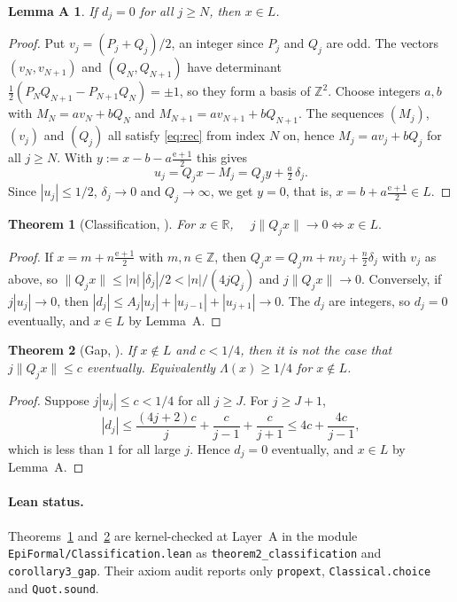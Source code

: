 \documentclass[11pt]{article}
\newtheorem{theorem}{Theorem}
\newtheorem*{lemmaA}{Lemma A}
\theoremstyle{definition}
\theoremstyle{remark}
\newcommand{\R}{\mathbb{R}}
\newcommand{\Z}{\mathbb{Z}}
\newcommand{\ee}{\mathrm{e}}
\newcommand{\Lam}{\Lambda}
\begin{document}
\begin{lemmaA}
If $d_j=0$ for all $j\ge N$, then $x\in L$.
\end{lemmaA}

\begin{proof}
Put $v_j=(P_j+Q_j)/2$, an integer since $P_j$ and $Q_j$ are odd. The
vectors $(v_N,v_{N+1})$ and $(Q_N,Q_{N+1})$ have determinant
$\tfrac12(P_NQ_{N+1}-P_{N+1}Q_N)=\pm1$, so they form a basis of $\Z^2$.
Choose integers $a,b$ with $M_N=av_N+bQ_N$ and $M_{N+1}=av_{N+1}+bQ_{N+1}$.
The sequences $(M_j)$, $(v_j)$ and $(Q_j)$ all satisfy \eqref{eq:rec}
from index $N$ on, hence $M_j=av_j+bQ_j$ for all $j\ge N$. With
$y:=x-b-a\frac{\ee+1}{2}$ this gives
\[
 u_j=Q_jx-M_j=Q_jy+\tfrac a2\,\delta_j .
\]
Since $|u_j|\le1/2$, $\delta_j\to0$ and $Q_j\to\infty$, we get $y=0$, that
is, $x=b+a\frac{\ee+1}{2}\in L$.
\end{proof}

\begin{theorem}[Classification, {\cite[Thm.~2]{Phase1}}]\label{thm:class}
For $x\in\R$, $\quad j\|Q_jx\|\to0\iff x\in L.$
\end{theorem}

\begin{proof}
If $x=m+n\frac{\ee+1}{2}$ with $m,n\in\Z$, then
$Q_jx=Q_jm+nv_j+\tfrac n2\delta_j$ with $v_j$ as above, so
$\|Q_jx\|\le|n|\,|\delta_j|/2<|n|/(4jQ_j)$ and $j\|Q_jx\|\to0$.
Conversely, if $j|u_j|\to0$, then
$|d_j|\le A_j|u_j|+|u_{j-1}|+|u_{j+1}|\to0$. The $d_j$ are integers, so
$d_j=0$ eventually, and $x\in L$ by Lemma~A.
\end{proof}

\begin{theorem}[Gap, {\cite[Cor.~3]{Phase1}}]\label{thm:gap}
If $x\notin L$ and $c<1/4$, then it is \emph{not} the case that
$j\|Q_jx\|\le c$ eventually. Equivalently $\Lam(x)\ge1/4$ for $x\notin L$.
\end{theorem}

\begin{proof}
Suppose $j|u_j|\le c<1/4$ for all $j\ge J$. For $j\ge J+1$,
\[
 |d_j|\le\frac{(4j+2)c}{j}+\frac{c}{j-1}+\frac{c}{j+1}
 \le4c+\frac{4c}{j-1},
\]
which is less than $1$ for all large $j$. Hence $d_j=0$ eventually, and
$x\in L$ by Lemma~A.
\end{proof}

\paragraph{Lean status.} Theorems~\ref{thm:class} and~\ref{thm:gap} are
kernel-checked at Layer~A in the module
\texttt{EpiFormal/\allowbreak Classification.lean} as
\texttt{theorem2\_\allowbreak classification} and
\texttt{corollary3\_\allowbreak gap}. Their axiom audit reports
only \texttt{propext}, \texttt{Classical.choice} and \texttt{Quot.sound}.
\end{document}
